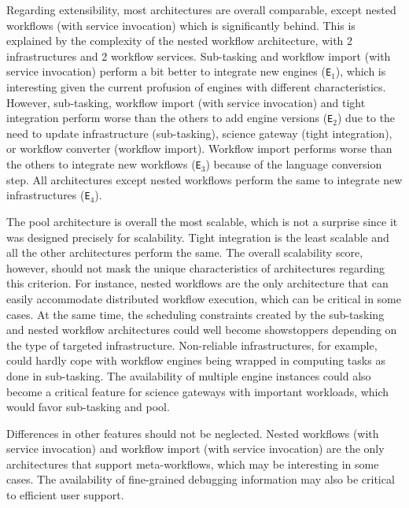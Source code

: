 \documentclass[preprint,3p,twocolumn]{elsarticle}
\begin{document}
Regarding extensibility, most architectures are overall comparable,
except nested workflows (with service invocation) which is
significantly behind. This is explained by the complexity of the
nested workflow architecture, with 2 infrastructures and 2 workflow
services. Sub-tasking and workflow import (with service invocation)
perform a bit better to integrate new engines (\texttt{E$_1$}), which
is interesting given the current profusion of engines with different
characteristics.  However, sub-tasking, workflow import (with service
invocation) and tight integration perform worse than the others to add
engine versions (\texttt{E$_2$}) due to the need to update
infrastructure (sub-tasking), science gateway (tight integration), or
workflow converter (workflow import). Workflow import performs worse
than the others to integrate new workflows (\texttt{E$_3$}) because of
the language conversion step. All architectures except nested
workflows perform the same to integrate new infrastructures (\texttt{E$_4$}).

The pool architecture is overall the most scalable, which is not a
surprise since it was designed precisely for scalability. Tight
integration is the least scalable and all the other architectures
perform the same. The overall scalability score, however, should not
mask the unique characteristics of architectures regarding this
criterion. For instance, nested workflows are the only architecture
that can easily accommodate distributed workflow execution, which can
be critical in some cases. At the same time, the scheduling
constraints created by the sub-tasking and nested workflow
architectures could well become showstoppers depending on the type of
targeted infrastructure. Non-reliable infrastructures, for example,
could hardly cope with workflow engines being wrapped in computing
tasks as done in sub-tasking. The availability of multiple engine
instances could also become a critical feature for science gateways
with important workloads, which would favor sub-tasking and pool.

Differences in other features should not be neglected. Nested
workflows (with service invocation) and workflow import (with service
invocation) are the only architectures that support meta-workflows,
which may be interesting in some cases. The availability of
fine-grained debugging information may also be critical to efficient
user support. 
\end{document}
